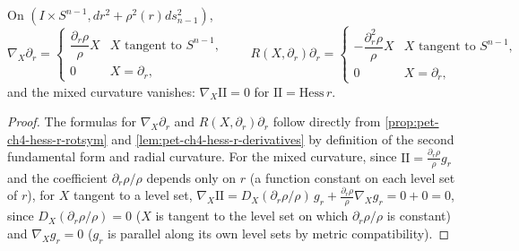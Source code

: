 \begin{proposition}
  \label{prop:pet-ch4-rotsym-radial-jacobi}

  On $(I\times S^{n-1},dr^2+\rho^2(r)ds_{n-1}^2)$,
  \[
    \nabla_X\partial_r=\begin{cases}\dfrac{\partial_r\rho}{\rho}X&X\text{ tangent to }S^{n-1},\\[4pt]0&X=\partial_r,\end{cases}
    \qquad
    R(X,\partial_r)\partial_r=\begin{cases}-\dfrac{\partial_r^2\rho}{\rho}X&X\text{ tangent to }S^{n-1},\\[4pt]0&X=\partial_r,\end{cases}
  \]
  and the mixed curvature vanishes: $\nabla_X\mathrm{II}=0$ for $\mathrm{II}=\mathrm{Hess}\,r$.
\end{proposition}
\begin{proof}
  \sketch
  The formulas for $\nabla_X\partial_r$ and $R(X,\partial_r)\partial_r$ follow directly
  from \cref{prop:pet-ch4-hess-r-rotsym} and
  \cref{lem:pet-ch4-hess-r-derivatives} by
  definition of the second fundamental form and radial curvature. For the mixed
  curvature, since $\mathrm{II}=\tfrac{\partial_r\rho}{\rho}g_r$ and the coefficient
  $\partial_r\rho/\rho$ depends only on $r$ (a function constant on each level set
  of $r$), for $X$ tangent to a level set,
  $\nabla_X\mathrm{II}=D_X(\partial_r\rho/\rho)\,g_r+\tfrac{\partial_r\rho}{\rho}\nabla_Xg_r=0+0=0$,
  since $D_X(\partial_r\rho/\rho)=0$ ($X$ is tangent to the level set on which
  $\partial_r\rho/\rho$ is constant) and $\nabla_Xg_r=0$ ($g_r$ is parallel along its
  own level sets by metric compatibility).
\end{proof}

